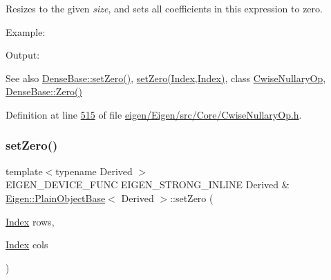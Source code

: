 Resizes to the given {\itshape size}, and sets all coefficients in this expression to zero.

Example\+: 
\begin{DoxyCodeInclude}
\end{DoxyCodeInclude}
 Output\+: 
\begin{DoxyVerbInclude}
\end{DoxyVerbInclude}


\begin{DoxySeeAlso}{See also}
\hyperlink{group___core___module_ac74411ddeea2545bf20baf14613be47e}{Dense\+Base\+::set\+Zero()}, \hyperlink{class_eigen_1_1_plain_object_base_a4f7022ad80446854a068d4d3bfa98446}{set\+Zero(\+Index,\+Index)}, class \hyperlink{group___core___module_class_eigen_1_1_cwise_nullary_op}{Cwise\+Nullary\+Op}, \hyperlink{group___core___module_a8c4be762b10041d64a2b2ce85bb14ba0}{Dense\+Base\+::\+Zero()} 
\end{DoxySeeAlso}


Definition at line \hyperlink{eigen_2_eigen_2src_2_core_2_cwise_nullary_op_8h_source_l00515}{515} of file \hyperlink{eigen_2_eigen_2src_2_core_2_cwise_nullary_op_8h_source}{eigen/\+Eigen/src/\+Core/\+Cwise\+Nullary\+Op.\+h}.

\mbox{\label{class_eigen_1_1_plain_object_base_a4f7022ad80446854a068d4d3bfa98446}} 
\subsubsection{\texorpdfstring{set\+Zero()}{setZero()}\hspace{0.1cm}{\footnotesize\ttfamily [2/2]}}
{\footnotesize\ttfamily template$<$typename Derived $>$ \\
E\+I\+G\+E\+N\+\_\+\+D\+E\+V\+I\+C\+E\+\_\+\+F\+U\+NC E\+I\+G\+E\+N\+\_\+\+S\+T\+R\+O\+N\+G\+\_\+\+I\+N\+L\+I\+NE Derived \& \hyperlink{class_eigen_1_1_plain_object_base}{Eigen\+::\+Plain\+Object\+Base}$<$ Derived $>$\+::set\+Zero (\begin{DoxyParamCaption}\item[{\hyperlink{namespace_eigen_a62e77e0933482dafde8fe197d9a2cfde}{Index}}]{rows,  }\item[{\hyperlink{namespace_eigen_a62e77e0933482dafde8fe197d9a2cfde}{Index}}]{cols }\end{DoxyParamCaption})}

